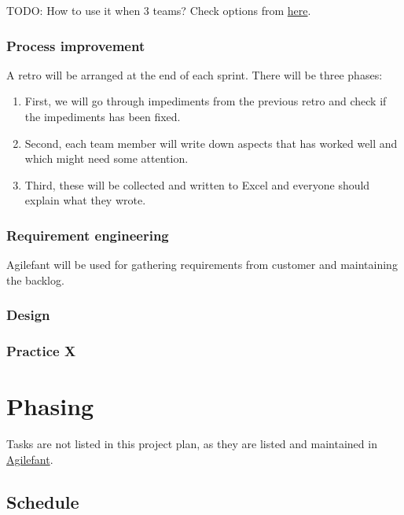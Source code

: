 TODO: How to use it when 3 teams? Check options from 
\href{https://www.atlassian.com/git/workflows}{here}.

\subsubsection{Process improvement}

A retro will be arranged at the end of each sprint. There will be three phases:

\begin{enumerate}
\item First, we will go through impediments from the previous retro and check 
if the impediments has been fixed.
\item Second, each team member will write down aspects that has worked well and 
which might need some attention.
\item Third, these will be collected and written to Excel and everyone should 
explain what they wrote.
\end{enumerate}

\subsubsection{Requirement engineering}

Agilefant will be used for gathering requirements from customer and maintaining 
the backlog. 

\subsubsection{Design}

\subsubsection{Practice X}

\section{Phasing}

Tasks are not listed in this project plan, as they are listed and maintained in 
\href{https://cloud.agilefant.com/dev/}{Agilefant}.

\subsection{Schedule}



